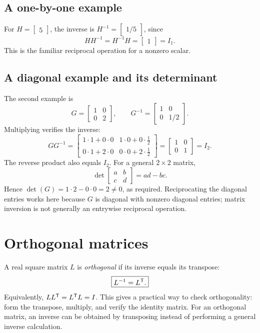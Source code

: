 \subsection{A one-by-one example}
For $H=\begin{bmatrix}5\end{bmatrix}$, the inverse is
$H^{-1}=\begin{bmatrix}1/5\end{bmatrix}$, since
\[
 HH^{-1}=H^{-1}H=\begin{bmatrix}1\end{bmatrix}=I_1.
\]
This is the familiar reciprocal operation for a nonzero scalar.

\subsection{A diagonal example and its determinant}
The second example is
\[
 G=\begin{bmatrix}1&0\\0&2\end{bmatrix},
 \qquad
 G^{-1}=\begin{bmatrix}1&0\\0&1/2\end{bmatrix}.
\]
Multiplying verifies the inverse:
\[
 GG^{-1}
 =\begin{bmatrix}
 1\cdot1+0\cdot0&1\cdot0+0\cdot\tfrac12\\
 0\cdot1+2\cdot0&0\cdot0+2\cdot\tfrac12
 \end{bmatrix}
 =\begin{bmatrix}1&0\\0&1\end{bmatrix}=I_2.
\]
The reverse product also equals $I_2$. For a general $2\times2$ matrix,
\[
 \det\begin{bmatrix}a&b\\c&d\end{bmatrix}=ad-bc.
\]
Hence $\det(G)=1\cdot2-0\cdot0=2\ne0$, as required. Reciprocating the
diagonal entries works here because $G$ is diagonal with nonzero diagonal
entries; matrix inversion is not generally an entrywise reciprocal operation.

\section{Orthogonal matrices}

A real square matrix $L$ is \emph{orthogonal} if its inverse equals its
transpose:
\begin{equation}
 \boxed{L^{-1}=L^{\mathsf T}.}
\end{equation}
Equivalently, $LL^{\mathsf T}=L^{\mathsf T} L=I$. This gives a practical way to check
orthogonality: form the transpose, multiply, and verify the identity matrix.
For an orthogonal matrix, an inverse can be obtained by transposing instead of
performing a general inverse calculation.

